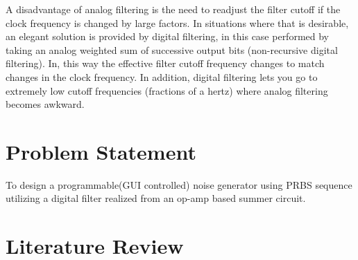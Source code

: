 \documentclass[a4paper,12pt]{article}
\begin{document}
A disadvantage of analog filtering is the need to readjust the filter cutoff if the clock frequency is changed by large factors. In situations where that is desirable, an elegant solution is provided by digital filtering, in this case performed by taking an analog weighted sum of successive output bits (non-recursive digital filtering). In, this way the effective filter cutoff frequency changes to match changes in the clock frequency. In addition, digital filtering lets you go to extremely low cutoff frequencies (fractions of a hertz) where analog filtering becomes awkward.

\section{Problem Statement}
To design a programmable(GUI controlled) noise generator using PRBS sequence utilizing a digital filter realized from an op-amp based summer circuit.

\section{Literature Review}
\end{document}
